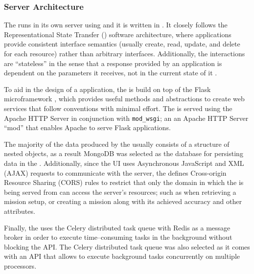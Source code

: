 \subsubsection{Server Architecture} \label{subsubsect:case-study:arch:server}

The \mlblinkapi runs in its own server using \ubuntu and it is written in \python. It closely follows the Representational State Transfer (\rest) software architecture, where applications provide consistent interface semantics (usually create, read, update, and delete for each resource) rather than arbitrary interfaces. Additionally, the \rest interactions are ``stateless'' in the sense that a response provided by an application is dependent on the parameters it receives, not in the current state of it \cite{web:w3:rest}.

To aid in the design of a \rest application, the \mlblinkapi is build on top of the Flask microframework \cite{software:flask}, which provides useful methods and abstractions to create web services that follow \rest conventions with minimal effort. The \mlblinkapi is served using the Apache HTTP Server in conjunction with \texttt{mod\_wsgi}; an an Apache HTTP Server ``mod'' that enables Apache to serve Flask applications.

The majority of the data produced by the \mlblinkui usually consists of a structure of nested objects, as a result MongoDB was selected as the database for persisting data in the \mlblinkapi. Additionally, since the UI uses Asynchronous JavaScript and XML (AJAX) requests to communicate with the server, the \mlblinkapi defines Cross-origin Resource Sharing (CORS) rules to restrict that only the domain in which the \mlblinkui is being served from can access the server's resources; such as when retrieving a mission setup, or creating a mission along with its achieved accuracy and other attributes.

Finally, the \mlblinkapi uses the Celery distributed task queue \cite{software:celery} with Redis as a message broker in order to execute time--consuming tasks in the background without blocking the API. The Celery distributed task queue was also selected as it comes with an API that allows to execute background tasks concurrently on multiple processors.